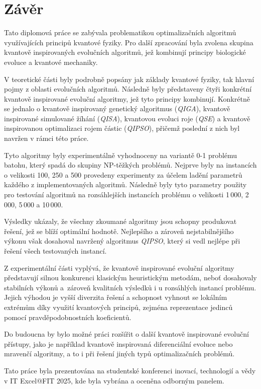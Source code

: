 \chapter{Závěr}
Tato diplomová práce se zabývala problematikou optimalizačních algoritmů využívajících principů kvantové fyziky. 
Pro další zpracování byla zvolena skupina kvantově inspirovaných evolučních algoritmů, jež kombinují principy biologické evoluce a kvantové mechaniky. 

V teoretické části byly podrobně popsány jak základy kvantové fyziky, tak hlavní pojmy z oblasti evolučních algoritmů. 
Následně byly představeny čtyři konkrétní kvantově inspirované evoluční algoritmy, jež tyto principy kombinují. 
Konkrétně se jednalo o kvantově inspirovaný genetický algoritmus (\emph{QIGA}), kvantově inspirované simulované žíhání (\emph{QISA}), kvantovou evoluci roje (\emph{QSE}) a kvantově inspirovanou optimalizaci rojem částic (\emph{QIPSO}), přičemž poslední z nich byl navržen v rámci této práce. 

Tyto algoritmy byly experimentálně vyhodnoceny na variantě 0-1 problému batohu, který spadá do skupiny NP-těžkých problémů. 
Nejprve byly na instancích o velikosti 100, 250 a 500 provedeny experimenty za účelem ladění parametrů každého z implementovaných algoritmů. 
Následně byly tyto parametry použity pro testování algoritmů na rozsáhlejších instancích problému o velikosti 1\,000, 2\,000, 5\,000 a 10\,000. 

Výsledky ukázaly, že všechny zkoumané algoritmy jsou schopny produkovat řešení, jež se blíží optimální hodnotě. 
Nejlepšího a zároveň nejstabilnějšího výkonu však dosahoval navržený algoritmus \emph{QIPSO}, který si vedl nejlépe při řešení všech testovaných instancí. 

Z experimentální části vyplývá, že kvantově inspirované evoluční algoritmy představují silnou konkurenci klasickým heuristickým metodám, neboť dosahovaly stabilních výkonů a~zároveň kvalitních výsledků i u rozsáhlých instancí problému. 
Jejich výhodou je vyšší diverzita řešení a schopnost vyhnout se lokálním extrémům díky využití kvantových principů, zejména reprezentace jedinců pomocí pravděpodobnostních koeficientů. 

Do budoucna by bylo možné práci rozšířit o další kvantově inspirované evoluční přístupy, jako je například kvantově inspirovaná diferenciální evoluce nebo mravenčí algoritmy, a to i při řešení jiných typů optimalizačních problémů.

Tato práce byla prezentována na studentské konferenci inovací, technologií a vědy v IT Excel@FIT 2025, kde byla vybrána a oceněna odborným panelem. 
